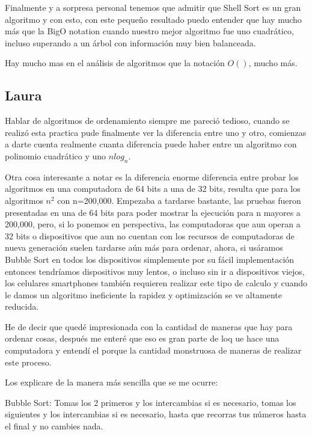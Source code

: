 \documentclass[12pt, fleqn]{report}                             %
\theoremstyle{break}                                            %
\begin{document}
    	    Finalmente y a sorpresa personal tenemos que admitir que Shell Sort es un gran algoritmo y con esto, con este pequeño resultado puedo entender que hay mucho más que la BigO notation
    	    cuando nuestro mejor algoritmo fue uno cuadrático, incluso superando a un árbol con información muy bien balanceada.
    	    
    	    Hay mucho mas en el análisis de algoritmos que la notación $O()$, mucho más.
    	    
	    	\subsection{Laura}
	    	Hablar de algoritmos de ordenamiento siempre me pareció tedioso, cuando se realizó esta practica pude finalmente ver la diferencia entre uno y otro, comienzas a darte cuenta realmente cuanta diferencia puede haber entre un algoritmo con polinomio cuadrático y uno $n log_{n}$.
	    	
	    	Otra cosa interesante a notar es la diferencia enorme diferencia entre probar los algoritmos en una computadora de 64 bits a una de 32 bits, resulta que para los algoritmos $n^2$ con n=200,000. Empezaba a tardarse bastante, las pruebas fueron presentadas en una de 64 bits para poder mostrar la ejecución para n mayores a 200,000, pero, si lo ponemos en perspectiva, las computadoras que aun operan a 32 bits o dispositivos que aun no cuentan con los recursos de computadoras de nueva generación suelen tardarse aún más para ordenar, ahora, si usáramos Bubble Sort en todos los dispositivos simplemente por su fácil implementación entonces tendríamos dispositivos muy lentos, o incluso sin ir a dispositivos viejos, los celulares smartphones también requieren realizar este tipo de calculo y cuando le damos un algoritmo ineficiente la rapidez y optimización se ve altamente reducida.
	    	
	    	He de decir que quedé impresionada con la cantidad de maneras que hay para ordenar cosas, después me enteré que eso es gran parte de loq ue hace una computadora y entendí el porque la cantidad monstruosa de maneras de realizar este proceso.
	    	
	    	Los explicare de la manera más sencilla que se me ocurre:
	    	
	    	Bubble Sort: Tomas los 2 primeros y los intercambias si es necesario, tomas los siguientes y los intercambias si es necesario, hasta que recorras tus números hasta el final y no cambies nada.
	    	
\end{document}
